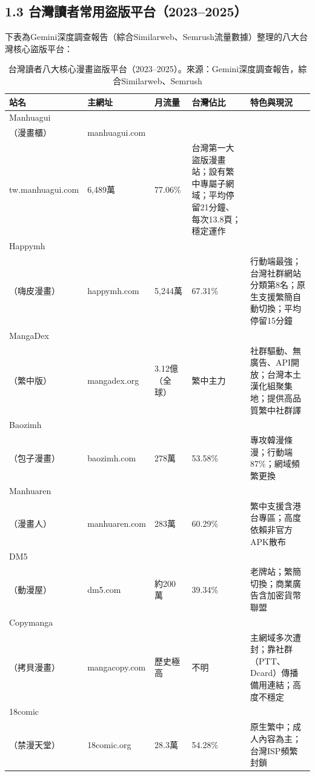 \documentclass[12pt, a4paper]{article}
\begin{document}
\subsection{1.3 台灣讀者常用盜版平台（2023–2025）}

下表為Gemini深度調查報告（綜合Similarweb、Semrush流量數據）整理的八大台灣核心盜版平台：

\begin{table}[H]
\centering\small
\begin{tabular}{p{2.3cm}p{2.2cm}p{1.6cm}p{1.8cm}p{4.3cm}}
\toprule
\textbf{站名} & \textbf{主網址} & \textbf{月流量} & \textbf{台灣佔比} & \textbf{特色與現況} \\
\midrule
Manhuagui\\（漫畫櫃） & manhuagui.com\\tw.manhuagui.com & 6,489萬 & 77.06\% & 台灣第一大盜版漫畫站；設有繁中專屬子網域；平均停留21分鐘、每次13.8頁；穩定運作 \\
\midrule
Happymh\\（嗨皮漫畫） & happymh.com & 5,244萬 & 67.31\% & 行動端最強；台灣社群網站分類第8名；原生支援繁簡自動切換；平均停留15分鐘 \\
\midrule
MangaDex\\（繁中版） & mangadex.org & 3.12億（全球） & 繁中主力 & 社群驅動、無廣告、API開放；台灣本土漢化組聚集地；提供高品質繁中社群譯 \\
\midrule
Baozimh\\（包子漫畫） & baozimh.com & 278萬 & 53.58\% & 專攻韓漫條漫；行動端87\%；網域頻繁更換 \\
\midrule
Manhuaren\\（漫畫人） & manhuaren.com & 283萬 & 60.29\% & 繁中支援含港台專區；高度依賴非官方APK散布 \\
\midrule
DM5\\（動漫屋） & dm5.com & 約200萬 & 39.34\% & 老牌站；繁簡切換；商業廣告含加密貨幣聯盟 \\
\midrule
Copymanga\\（拷貝漫畫） & mangacopy.com & 歷史極高 & 不明 & 主網域多次遭封；靠社群（PTT、Dcard）傳播備用連結；高度不穩定 \\
\midrule
18comic\\（禁漫天堂） & 18comic.org & 28.3萬 & 54.28\% & 原生繁中；成人內容為主；台灣ISP頻繁封鎖 \\
\bottomrule
\end{tabular}
\caption{台灣讀者八大核心漫畫盜版平台（2023–2025）。來源：Gemini深度調查報告，綜合Similarweb、Semrush}
\end{table}
\end{document}
